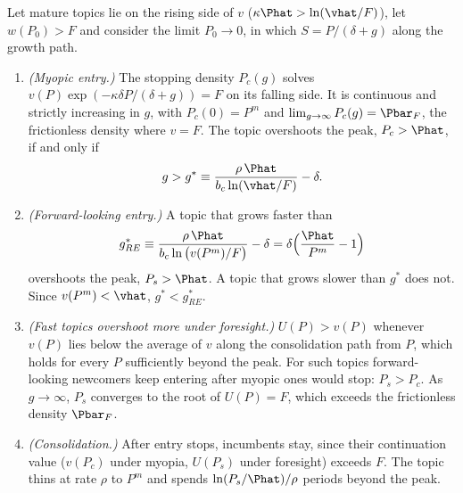 \begin{proposition}\label{prop:toofast}
Let mature topics lie on the rising side of $v$ ($\kappa\Phat>\ln(\vhat/F)$), let
$w(P_0)>F$ and consider the limit $P_0\to0$, in which $S=P/(\delta+g)$ along the
growth path.
\begin{enumerate}[label=(\roman*)]
\item \emph{(Myopic entry.)} The stopping density $P_c(g)$ solves $v(P)\exp(-\kappa\delta P/(\delta+g))=F$ on its falling side. It is continuous and strictly increasing in $g$, with $P_c(0)=P^m$ and $\lim_{g\to\infty}P_c(g)=\Pbar_F$, the frictionless density where $v=F$. The topic overshoots the peak, $P_c>\Phat$, if and only if
\begin{equation}\label{eq:gstar}
g>g^*\equiv\frac{\rho\,\Phat}{b_c\ln(\vhat/F)}-\delta .
\end{equation}
\item \emph{(Forward-looking entry.)} A topic that grows faster than
\[
g^*_{RE}\equiv\frac{\rho\,\Phat}{b_c\ln\big(v(P^m)/F\big)}-\delta=\delta\Big(\frac{\Phat}{P^m}-1\Big)
\]
overshoots the peak, $P_s>\Phat$. A topic that grows slower than $g^*$ does not. Since $v(P^m)<\vhat$, $g^*<g^*_{RE}$.
\item \emph{(Fast topics overshoot more under foresight.)} $U(P)>v(P)$ whenever $v(P)$ lies below the average of $v$ along the consolidation path from $P$, which holds for every $P$ sufficiently beyond the peak. For such topics forward-looking newcomers keep entering after myopic ones would stop: $P_s>P_c$. As $g\to\infty$, $P_s$ converges to the root of $U(P)=F$, which exceeds the frictionless density $\Pbar_F$.
\item \emph{(Consolidation.)} After entry stops, incumbents stay, since their continuation value ($v(P_c)$ under myopia, $U(P_s)$ under foresight) exceeds $F$. The topic thins at rate $\rho$ to $P^m$ and spends $\ln(P_s/\Phat)/\rho$ periods beyond the peak.
\end{enumerate}
\end{proposition}

